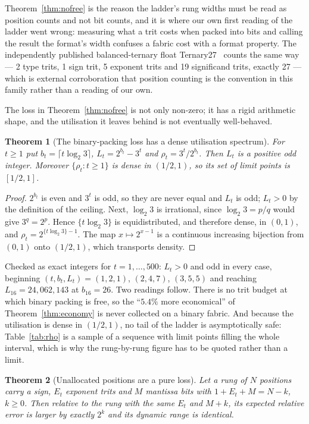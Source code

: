 \documentclass[11pt]{article}
\newtheorem{theorem}{Theorem}
\theoremstyle{definition}
\begin{document}
Theorem~\ref{thm:nofree} is the reason the ladder's rung widths must be read as
position counts and not bit counts, and it is where our own first reading of the
ladder went wrong: measuring what a trit costs when packed into bits and calling
the result the format's width confuses a fabric cost with a format property. The
independently published balanced-ternary float Ternary27~\cite{ternary27} counts
the same way --- 2 type trits, 1 sign trit, 5 exponent trits and 19 significand
trits, exactly 27 --- which is external corroboration that position counting is
the convention in this family rather than a reading of our own.

The loss in Theorem~\ref{thm:nofree} is not only non-zero; it has a rigid
arithmetic shape, and the utilisation it leaves behind is not eventually
well-behaved.

\begin{theorem}[The binary-packing loss has a dense utilisation spectrum]
\label{thm:packing-density}
For $t\geq1$ put $b_t=\lceil t\log_2 3\rceil$, $L_t=2^{b_t}-3^{t}$ and
$\rho_t=3^{t}/2^{b_t}$. Then $L_t$ is a positive odd integer. Moreover
$\{\rho_t : t\geq1\}$ is dense in $(1/2,1)$, so its set of limit points is
$[1/2,1]$.
\end{theorem}
\begin{proof}
$2^{b_t}$ is even and $3^{t}$ is odd, so they are never equal and $L_t$ is odd;
$L_t>0$ by the definition of the ceiling. Next, $\log_2 3$ is irrational, since
$\log_2 3=p/q$ would give $3^{q}=2^{p}$. Hence $\{t\log_2 3\}$ is
equidistributed, and therefore dense, in $(0,1)$, and
$\rho_t=2^{\{t\log_2 3\}-1}$. The map $x\mapsto2^{x-1}$ is a continuous
increasing bijection from $(0,1)$ onto $(1/2,1)$, which transports density.
\end{proof}

Checked as exact integers for $t=1,\dots,500$: $L_t>0$ and odd in every case,
beginning $(t,b_t,L_t)=(1,2,1)$, $(2,4,7)$, $(3,5,5)$ and reaching
$L_{16}=24{,}062{,}143$ at $b_{16}=26$. Two readings follow. There is no trit
budget at which binary packing is free, so the ``$5.4\%$ more economical'' of
Theorem~\ref{thm:economy} is never collected on a binary fabric. And because the
utilisation is dense in $(1/2,1)$, no tail of the ladder is asymptotically safe:
Table~\ref{tab:rho} is a sample of a sequence with limit points filling the whole
interval, which is why the rung-by-rung figure has to be quoted rather than a
limit.

\begin{theorem}[Unallocated positions are a pure loss]
\label{thm:alloc}
Let a rung of $N$ positions carry a sign, $E_t$ exponent trits and $M$ mantissa
bits with $1 + E_t + M = N - k$, $k \geq 0$. Then relative to the rung with the
same $E_t$ and $M + k$, its expected relative error is larger by exactly $2^{k}$
and its dynamic range is identical.
\end{theorem}
\end{document}

